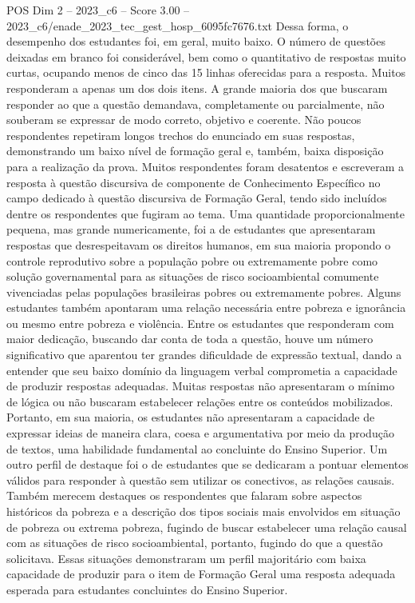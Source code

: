 \begin{textsample}{POS Dim 2 – 2023\_c6 – Score 3.00 – 2023\_c6/enade\_2023\_tec\_gest\_hosp\_6095fc7676.txt}
Dessa forma, o desempenho dos estudantes foi, em geral, muito baixo.
O número de questões deixadas em branco foi considerável, bem como o quantitativo de respostas muito curtas, ocupando menos de cinco das 15 linhas oferecidas para a resposta.
Muitos responderam a apenas um dos dois itens.
A grande maioria dos que buscaram responder ao que a questão demandava, completamente ou parcialmente, não souberam se expressar de modo correto, objetivo e coerente.
Não poucos respondentes repetiram longos trechos do enunciado em suas respostas, demonstrando um baixo nível de formação geral e, também, baixa disposição para a realização da prova.
Muitos respondentes foram desatentos e escreveram a resposta à questão discursiva de componente de Conhecimento Específico no campo dedicado à questão discursiva de Formação Geral, tendo sido incluídos dentre os respondentes que fugiram ao tema.
Uma quantidade proporcionalmente pequena, mas grande numericamente, foi a de estudantes que apresentaram respostas que desrespeitavam os direitos humanos, em sua maioria propondo o controle reprodutivo sobre a população pobre ou extremamente pobre como solução governamental para as situações de risco socioambiental comumente vivenciadas pelas populações brasileiras pobres ou extremamente pobres.
Alguns estudantes também apontaram uma relação necessária entre pobreza e ignorância ou mesmo entre pobreza e violência.
Entre os estudantes que responderam com maior dedicação, buscando dar conta de toda a questão, houve um número significativo que aparentou ter grandes dificuldade de expressão textual, dando a entender que seu baixo domínio da linguagem verbal comprometia a capacidade de produzir respostas adequadas.
Muitas respostas não apresentaram o mínimo de lógica ou não buscaram estabelecer relações entre os conteúdos mobilizados.
Portanto, em sua maioria, os estudantes não apresentaram a capacidade de expressar ideias de maneira clara, coesa e argumentativa por meio da produção de textos, uma habilidade fundamental ao concluinte do Ensino Superior.
Um outro perfil de destaque foi o de estudantes que se dedicaram a pontuar elementos válidos para responder à questão sem utilizar os conectivos, as relações causais.
Também merecem destaques os respondentes que falaram sobre aspectos históricos da pobreza e a descrição dos tipos sociais mais envolvidos em situação de pobreza ou extrema pobreza, fugindo de buscar estabelecer uma relação causal com as situações de risco socioambiental, portanto, fugindo do que a questão solicitava.
Essas situações demonstraram um perfil majoritário com baixa capacidade de produzir para o item de Formação Geral uma resposta adequada esperada para estudantes concluintes do Ensino Superior.

\end{textsample}
